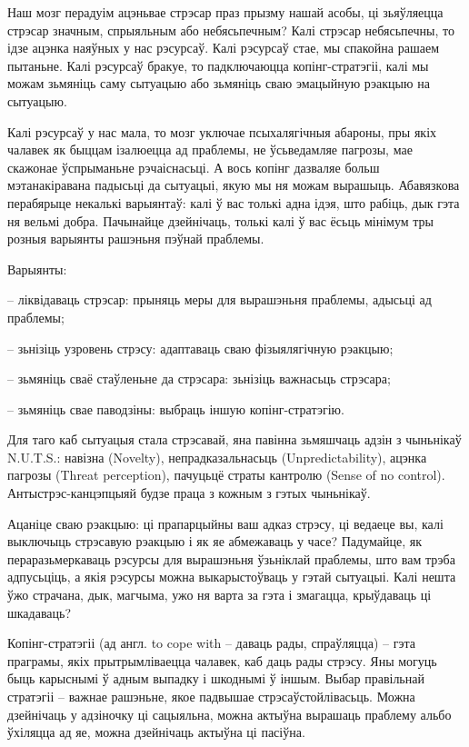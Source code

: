 Наш мозг перадуім ацэньвае стрэсар праз прызму нашай асобы, ці зьяўляецца стрэсар значным, спрыяльным або небясьпечным? Калі стрэсар небясьпечны, то ідзе ацэнка наяўных у нас рэсурсаў. Калі рэсурсаў стае, мы спакойна рашаем пытаньне. Калі рэсурсаў бракуе, то падключаюцца копінг-стратэгіі, калі мы можам зьмяніць саму сытуацыю або зьмяніць сваю эмацыйную рэакцыю на сытуацыю.

Калі рэсурсаў у нас мала, то мозг уключае псыхалягічныя абароны, пры якіх чалавек як быццам ізалюецца ад праблемы, не ўсьведамляе пагрозы, мае скажонае ўспрыманьне рэчаіснасьці. А вось копінг дазваляе больш мэтанакіравана падысьці да сытуацыі, якую мы ня можам вырашыць. Абавязкова перабярыце некалькі варыянтаў: калі ў вас толькі адна ідэя, што рабіць, дык гэта ня вельмі добра. Пачынайце дзейнічаць, толькі калі ў вас ёсьць мінімум тры розныя варыянты рашэньня пэўнай праблемы.

Варыянты: 

– ліквідаваць стрэсар: прыняць меры для вырашэньня праблемы, адысьці ад праблемы;

– зьнізіць узровень стрэсу: адаптаваць сваю фізыялягічную рэакцыю;

– зьмяніць сваё стаўленьне да стрэсара: зьнізіць важнасьць стрэсара;

– зьмяніць свае паводзіны: выбраць іншую копінг-стратэгію.

Для таго каб сытуацыя стала стрэсавай, яна павінна зьмяшчаць адзін з чыньнікаў N.U.T.S.: навізна (Novelty), непрадказальнасьць (Unpredictability), ацэнка пагрозы (Threat perception), пачуцьцё страты кантролю (Sense of no control). Антыстрэс-канцэпцыяй будзе праца з кожным з гэтых чыньнікаў.

Ацаніце сваю рэакцыю: ці прапарцыйны ваш адказ стрэсу, ці ведаеце вы, калі выключыць стрэсавую рэакцыю і як яе абмежаваць у часе? Падумайце, як пераразьмеркаваць рэсурсы для вырашэньня ўзьніклай праблемы, што вам трэба адпусьціць, а якія рэсурсы можна выкарыстоўваць у гэтай сытуацыі. Калі нешта ўжо страчана, дык, магчыма, ужо ня варта за гэта і змагацца, крыўдаваць ці шкадаваць?

Копінг-стратэгіі (ад англ. to cope with – даваць рады, спраўляцца) – гэта праграмы, якіх прытрымліваецца чалавек, каб даць рады стрэсу. Яны могуць быць карыснымі ў адным выпадку і шкоднымі ў іншым. Выбар правільнай стратэгіі – важнае рашэньне, якое падвышае стрэсаўстойлівасьць. Можна дзейнічаць у адзіночку ці сацыяльна, можна актыўна вырашаць праблему альбо ўхіляцца ад яе, можна дзейнічаць актыўна ці пасіўна.

